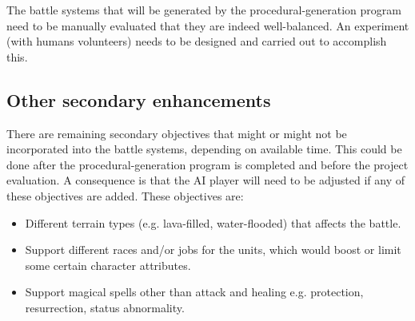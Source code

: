 \documentclass[a4paper,11pt]{article}
\begin{document}
The battle systems that will be generated by the procedural-generation program need to be manually evaluated that they are indeed well-balanced. An experiment (with humans volunteers) needs to be designed and carried out to accomplish this.

\subsection*{Other secondary enhancements}

There are remaining secondary objectives that might or might not be incorporated into the battle systems, depending on available time. This could be done after the procedural-generation program is completed and before the project evaluation. A consequence is that the AI player will need to be adjusted if any of these objectives are added. These objectives are:
\begin{itemize}
	\item Different terrain types (e.g. lava-filled, water-flooded) that affects the battle.
	\item Support different races and/or jobs for the units, which would boost or limit some certain character attributes.
	\item Support magical spells other than attack and healing e.g. protection, resurrection, status abnormality.
\end{itemize}
\end{document}
